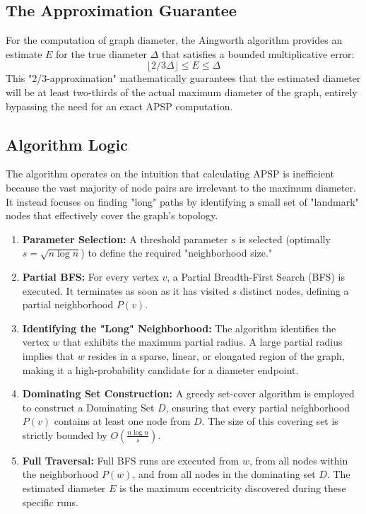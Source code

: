\subsection{The Approximation Guarantee}
For the computation of graph diameter, the Aingworth algorithm provides an estimate $E$ for the true diameter $\Delta$ that satisfies a bounded multiplicative error:
\[
\lfloor 2/3 \Delta \rfloor \le E \le \Delta
\]
This "2/3-approximation" mathematically guarantees that the estimated diameter will be at least two-thirds of the actual maximum diameter of the graph, entirely bypassing the need for an exact APSP computation.

\subsection{Algorithm Logic}
The algorithm operates on the intuition that calculating APSP is inefficient because the vast majority of node pairs are irrelevant to the maximum diameter. It instead focuses on finding "long" paths by identifying a small set of "landmark" nodes that effectively cover the graph's topology.
\begin{enumerate}
    \item \textbf{Parameter Selection:} A threshold parameter $s$ is selected (optimally $s = \sqrt{n \log n}$) to define the required "neighborhood size."
    \item \textbf{Partial BFS:} For every vertex $v$, a Partial Breadth-First Search (BFS) is executed. It terminates as soon as it has visited $s$ distinct nodes, defining a partial neighborhood $P(v)$.
    \item \textbf{Identifying the "Long" Neighborhood:} The algorithm identifies the vertex $w$ that exhibits the maximum partial radius. A large partial radius implies that $w$ resides in a sparse, linear, or elongated region of the graph, making it a high-probability candidate for a diameter endpoint.
    \item \textbf{Dominating Set Construction:} A greedy set-cover algorithm is employed to construct a Dominating Set $D$, ensuring that every partial neighborhood $P(v)$ contains at least one node from $D$. The size of this covering set is strictly bounded by $O(\frac{n \log n}{s})$.
    \item \textbf{Full Traversal:} Full BFS runs are executed from $w$, from all nodes within the neighborhood $P(w)$, and from all nodes in the dominating set $D$. The estimated diameter $E$ is the maximum eccentricity discovered during these specific runs.
\end{enumerate}

